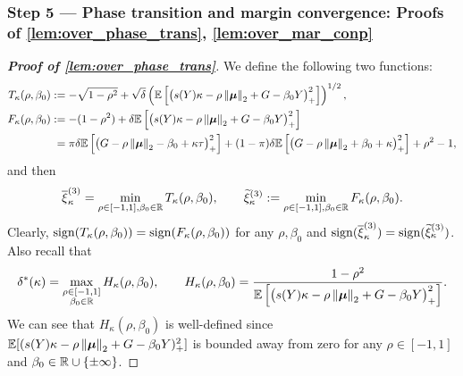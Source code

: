 \subsubsection{Step 5 --- Phase transition and margin convergence: Proofs of \cref{lem:over_phase_trans}, \ref{lem:over_mar_conp}}
\label{subsubsec:over_phase}
\begin{proof}[\textbf{Proof of \cref{lem:over_phase_trans}}]
We define the following two functions:
\begin{equation}
    \label{eq:T_F_}
    \begin{aligned}
        T_\kappa(\rho, \beta_0) & := - \sqrt{1 - \rho^2} + \sqrt{\delta} \left( \mathbb{E}\left[ \bigl(  s(Y) \kappa - \rho \left\|{\text{\boldmath $\mu$}}\right\|_2 + G - \beta_0 Y \bigr)_+^2 \right] \right)^{1/2}, \\
        F_\kappa(\rho, \beta_0) & := -(1 - \rho^2) + \delta  \mathbb{E}\left[ \bigl(  s(Y) \kappa - \rho \left\|{\text{\boldmath $\mu$}}\right\|_2 + G - \beta_0 Y \bigr)_+^2 \right]
        \\
        & \phantom{:} = \pi \delta \mathbb{E} \left[ \bigl( G - \rho \left\|{\text{\boldmath $\mu$}}\right\|_2 - \beta_0 + \kappa \tau \bigr)_+^2 \right]  + (1-\pi) \delta \mathbb{E} \left[ \bigl( G - \rho \left\|{\text{\boldmath $\mu$}}\right\|_2 + \beta_0 + \kappa \bigr)_+^2 \right] + \rho^2 - 1,
    \end{aligned}
\end{equation}
and then
\begin{equation*}
    \overline\xi_{\kappa}^{(3)}  =  \min_{\rho \in [-1, 1] , \beta_0 \in  \mathbb{R} } T_\kappa(\rho, \beta_0),
    \qquad
    \widetilde\xi_{\kappa}^{(3)}  :=  \min_{\rho \in [-1, 1] , \beta_0 \in  \mathbb{R} } F_\kappa(\rho, \beta_0).
\end{equation*}
Clearly, $\mathrm{sign}(T_\kappa(\rho, \beta_0)) = \mathrm{sign}(F_\kappa(\rho, \beta_0))$ for any $\rho, \beta_0$ and $\mathrm{sign}(\overline\xi_{\kappa}^{(3)}) = \mathrm{sign}(\widetilde\xi_{\kappa}^{(3)})$. Also recall that
\begin{equation*}
    \delta^*(\kappa) = \max_{ \substack{\rho \in [-1, 1] \\ \beta_0 \in \mathbb{R} } }  H_\kappa(\rho, \beta_0),
    \qquad 
    H_\kappa(\rho, \beta_0) = \frac{1 - \rho^2}{\mathbb{E}\left[ \bigl(  s(Y) \kappa - \rho \left\|{\text{\boldmath $\mu$}}\right\|_2 + G - \beta_0 Y \bigr)_+^2 \right]}.
\end{equation*}
We can see that $H_\kappa(\rho, \beta_0)$ is well-defined since $\mathbb{E}[ (  s(Y) \kappa - \rho \left\|{\text{\boldmath $\mu$}}\right\|_2 + G - \beta_0 Y )_+^2 ]$ is bounded away from zero for any $\rho \in [-1, 1]$ and $\beta_0 \in \mathbb{R} \cup\{ \pm \infty \}$.


\end{proof}
